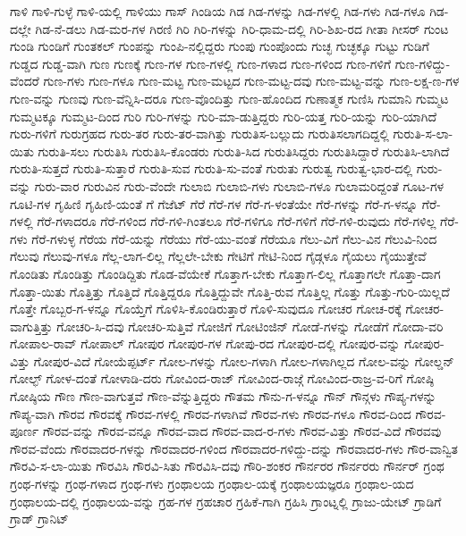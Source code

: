 {ಗಾಳಿ
ಗಾಳಿ-ಗುಳ್ಳೆ
ಗಾಳಿ-ಯಲ್ಲಿ
ಗಾಳಿಯು
ಗಾಸ್
ಗಿಂಡಿಯ
ಗಿಡ
ಗಿಡ-ಗಳನ್ನು
ಗಿಡ-ಗಳಲ್ಲಿ
ಗಿಡ-ಗಳು
ಗಿಡ-ಗಳೂ
ಗಿಡ-ದಲ್ಲೇ
ಗಿಡ-ನೆ-ಡಲು
ಗಿಡ-ಮರ-ಗಳ
ಗಿರಣಿ
ಗಿರಿ
ಗಿರಿ-ಗಳನ್ನು
ಗಿರಿ-ಧಾಮ-ದಲ್ಲಿ
ಗಿರಿ-ಶಿಖ-ರದ
ಗೀತಾ
ಗೀಸರ್
ಗುಂಟ
ಗುಂಡಿ
ಗುಂಡಿಗೆ
ಗುಂತಕಲ್
ಗುಂಪನ್ನು
ಗುಂಪಿ-ನಲ್ಲಿದ್ದರು
ಗುಂಪು
ಗುಂಪೊಂದು
ಗುಚ್ಛ
ಗುಚ್ಛಕ್ಕೂ
ಗುಟ್ಟು
ಗುಡಿಗೆ
ಗುಡ್ಡದ
ಗುಡ್ಡ-ವಾಗಿ
ಗುಣ
ಗುಣಕ್ಕೆ
ಗುಣ-ಗಳ
ಗುಣ-ಗಳಲ್ಲಿ
ಗುಣ-ಗಳಾದ
ಗುಣ-ಗಳಿಂದ
ಗುಣ-ಗಳಿಗೆ
ಗುಣ-ಗಳಿದ್ದು-ವೆಂದರೆ
ಗುಣ-ಗಳು
ಗುಣ-ಗಳೂ
ಗುಣ-ಮಟ್ಟ
ಗುಣ-ಮಟ್ಟದ
ಗುಣ-ಮಟ್ಟ-ದವು
ಗುಣ-ಮಟ್ಟ-ವನ್ನು
ಗುಣ-ಲಕ್ಷ-ಣ-ಗಳ
ಗುಣ-ವನ್ನು
ಗುಣವು
ಗುಣ-ವೆನ್ನಿಸಿ-ದರೂ
ಗುಣ-ವೊಂದಿತ್ತು
ಗುಣ-ಹೊಂದಿದ
ಗುಣಾತ್ಮಕ
ಗುಣಿಸಿ
ಗುಮಾನಿ
ಗುಮ್ಮಟ
ಗುಮ್ಮಟಕ್ಕೂ
ಗುಮ್ಮಟ-ದಿಂದ
ಗುರಿ
ಗುರಿ-ಗಳನ್ನು
ಗುರಿ-ಮಾ-ಡುತ್ತಿದ್ದರು
ಗುರಿ-ಯತ್ತ
ಗುರಿ-ಯನ್ನು
ಗುರಿ-ಯಾಗಿದೆ
ಗುರು-ಗಳಿಗೆ
ಗುರುಗ್ರಹದ
ಗುರು-ತರ
ಗುರು-ತರ-ವಾಗಿತ್ತು
ಗುರುತಿಸ-ಬಲ್ಲುದು
ಗುರುತಿಸಲಾಗದಿದ್ದಲ್ಲಿ
ಗುರುತಿ-ಸ-ಲಾ-ಯಿತು
ಗುರುತಿ-ಸಲು
ಗುರುತಿಸಿ
ಗುರುತಿಸಿ-ಕೊಂಡರು
ಗುರುತಿ-ಸಿದ
ಗುರುತಿಸಿದ್ದರು
ಗುರುತಿಸಿದ್ದಾರೆ
ಗುರುತಿಸಿ-ಲಾಗಿದೆ
ಗುರುತಿ-ಸುತ್ತದೆ
ಗುರುತಿ-ಸುತ್ತಾರೆ
ಗುರುತಿ-ಸುವ
ಗುರುತಿ-ಸು-ವಂತೆ
ಗುರುತು
ಗುರುತ್ವ
ಗುರುತ್ವ-ಭಾರ-ದಲ್ಲಿ
ಗುರು-ವನ್ನು
ಗುರು-ವಾರ
ಗುರುವಿನ
ಗುರು-ವೆಂದೇ
ಗುಲಾಬಿ
ಗುಲಾಬಿ-ಗಳು
ಗುಲಾಬಿ-ಗಳೂ
ಗುಲಾಮರಿದ್ದಂತೆ
ಗೂಟ-ಗಳ
ಗೂಟಿ-ಗಳ
ಗೃಹಿಣಿ
ಗೃಹಿಣಿ-ಯಂತೆ
ಗೆ
ಗೆಜೆಟ್
ಗೆರೆ
ಗೆರೆ-ಗಳ
ಗೆರೆ-ಗ-ಳಂತೆಯೇ
ಗೆರೆ-ಗಳನ್ನು
ಗೆರೆ-ಗ-ಳನ್ನೂ
ಗೆರೆ-ಗಳಲ್ಲಿ
ಗೆರೆ-ಗಳಾದರೂ
ಗೆರೆ-ಗಳಿಂದ
ಗೆರೆ-ಗಳಿ-ಗಿಂತಲೂ
ಗೆರೆ-ಗಳಿಗೂ
ಗೆರೆ-ಗಳಿಗೆ
ಗೆರೆ-ಗಳಿ-ರುವುದು
ಗೆರೆ-ಗಳಿಲ್ಲ
ಗೆರೆ-ಗಳು
ಗೆರೆ-ಗಳುಳ್ಳ
ಗೆರೆಯ
ಗೆರೆ-ಯನ್ನು
ಗೆರೆಯು
ಗೆರೆ-ಯು-ವಂತೆ
ಗೆರೆಯೂ
ಗೆಲು-ವಿಗೆ
ಗೆಲು-ವಿನ
ಗೆಲುವಿ-ನಿಂದ
ಗೆಲುವು
ಗೆಲುವು-ಗಳೂ
ಗೆಲ್ಲ-ಲಾಗ-ಲಿಲ್ಲ
ಗೆಲ್ಲಲೇ-ಬೇಕು
ಗೇಟಿಗೆ
ಗೇಟಿ-ನಿಂದ
ಗೈಡ್ಗಳೂ
ಗೈಯಲು
ಗೈಯುತ್ತೇವೆ
ಗೊಂಡಿತು
ಗೊಂಡಿತ್ತು
ಗೊಂಡಿದ್ದಿತು
ಗೊಡ-ವೆಯೇಕೆ
ಗೊತ್ತಾಗ-ಬೇಕು
ಗೊತ್ತಾಗ-ಲಿಲ್ಲ
ಗೊತ್ತಾಗಲೇ
ಗೊತ್ತಾ-ದಾಗ
ಗೊತ್ತಾ-ಯಿತು
ಗೊತ್ತಿತ್ತು
ಗೊತ್ತಿದೆ
ಗೊತ್ತಿದ್ದರೂ
ಗೊತ್ತಿದ್ದುವೇ
ಗೊತ್ತಿ-ರುವ
ಗೊತ್ತಿಲ್ಲ
ಗೊತ್ತು
ಗೊತ್ತು-ಗುರಿ-ಯಿಲ್ಲದೆ
ಗೊತ್ತೇ
ಗೊಬ್ಬರ-ಗ-ಳನ್ನೂ
ಗೊಯ್ತೆಗೆ
ಗೊಳಿಸಿ-ಕೊಂಡಿರುತ್ತಾರೆ
ಗೊಳಿ-ಸುವುದೂ
ಗೋಚರ
ಗೋಚ-ರಕ್ಕೆ
ಗೋಚರ-ವಾಗುತ್ತಿತ್ತು
ಗೋಚರಿ-ಸಿ-ದವು
ಗೋಚರಿ-ಸುತ್ತಿವೆ
ಗೋಜಿಗೆ
ಗೋಟಿಂಜಿನ್
ಗೋಡೆ-ಗಳನ್ನು
ಗೋಡೆಗೆ
ಗೋದಾ-ವರಿ
ಗೋಪಾಲ-ರಾವ್
ಗೋಪಾಲ್
ಗೋಪುರ
ಗೋಪುರ-ಗಳ
ಗೋಪು-ರದ
ಗೋಪುರ-ದಲ್ಲಿ
ಗೋಪುರ-ವನ್ನು
ಗೋಪುರ-ವಿತ್ತು
ಗೋಪುರ-ವಿದೆ
ಗೋಯೆಪ್ಪರ್ಟ್
ಗೋಲ-ಗಳನ್ನು
ಗೋಲ-ಗಳಾಗಿ
ಗೋಲ-ಗಳಾಗಿಲ್ಲದ
ಗೋಲ-ವನ್ನು
ಗೋಲ್ಡನ್
ಗೋಲ್ಫ್
ಗೋಳ-ದಂತೆ
ಗೋಳಾಡಿ-ದರು
ಗೋವಿಂದ-ರಾಜ್
ಗೋವಿಂದ-ರಾಜ್ಗೆ
ಗೋವಿಂದ-ರಾಜ್ರ-ವ-ರಿಗೆ
ಗೋಷ್ಠಿ
ಗೋಷ್ಠಿಯ
ಗೌಣ
ಗೌಣ-ವಾಗುತ್ತವೆ
ಗೌಣ-ವೆನ್ನುತ್ತಿದ್ದರು
ಗೌತಮ
ಗೌನು-ಗ-ಳನ್ನೂ
ಗೌನ್
ಗೌನ್ಗಳು
ಗೌಪ್ಯ-ಗಳನ್ನು
ಗೌಪ್ಯ-ವಾಗಿ
ಗೌರವ
ಗೌರವಕ್ಕೆ
ಗೌರವ-ಗಳಲ್ಲಿ
ಗೌರವ-ಗಳಾಗಿವೆ
ಗೌರವ-ಗಳು
ಗೌರವ-ಗಳೂ
ಗೌರವ-ದಿಂದ
ಗೌರವ-ಪೂರ್ಣ
ಗೌರವ-ವನ್ನು
ಗೌರವ-ವನ್ನೂ
ಗೌರವ-ವಾದ
ಗೌರವ-ವಾದ-ರ-ಗಳು
ಗೌರವ-ವಿತ್ತು
ಗೌರವ-ವಿದೆ
ಗೌರವವು
ಗೌರವ-ವೆಂದು
ಗೌರವಾದರ-ಗಳನ್ನು
ಗೌರವಾದರ-ಗಳಿಂದ
ಗೌರವಾದರ-ಗಳಿದ್ದು-ದನ್ನು
ಗೌರವಾದರ-ಗಳು
ಗೌರ-ವಾನ್ವಿತ
ಗೌರವಿ-ಸ-ಲಾ-ಯಿತು
ಗೌರವಿಸಿ
ಗೌರವಿ-ಸಿತು
ಗೌರವಿಸಿ-ದವು
ಗೌರಿ-ಶಂಕರ
ಗೌರ್ನರರ
ಗೌರ್ನರರು
ಗೌರ್ನರ್
ಗ್ರಂಥ
ಗ್ರಂಥ-ಗಳನ್ನು
ಗ್ರಂಥ-ಗಳಾದ
ಗ್ರಂಥ-ಗಳು
ಗ್ರಂಥಾಲಯ
ಗ್ರಂಥಾಲ-ಯಕ್ಕೆ
ಗ್ರಂಥಾಲಯಜ್ಞರೂ
ಗ್ರಂಥಾಲ-ಯದ
ಗ್ರಂಥಾಲಯ-ದಲ್ಲಿ
ಗ್ರಂಥಾಲಯ-ವನ್ನು
ಗ್ರಹ-ಗಳ
ಗ್ರಹಚಾರ
ಗ್ರಹಿಕೆ-ಗಾಗಿ
ಗ್ರಹಿಸಿ
ಗ್ರಾಂಟ್ನಲ್ಲಿ
ಗ್ರಾಜು-ಯೇಟ್
ಗ್ರಾಡಿಗೆ
ಗ್ರಾಡ್
ಗ್ರಾನಿಟ್
}
